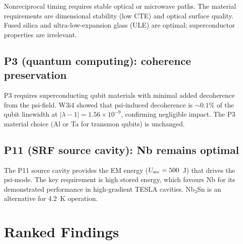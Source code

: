 \documentclass[11pt]{article}
\theoremstyle{definition}
\theoremstyle{remark}
\newcommand{\ee}[1]{\times 10^{#1}}
\newcommand{\lambdabound}{1.56\ee{-9}}
\newcommand{\lam}{|\lambda-1|}
\begin{document}
Nonreciprocal timing requires stable optical or microwave paths. The
material requirements are dimensional stability (low CTE) and optical
surface quality. Fused silica and ultra-low-expansion glass (ULE) are
optimal; superconductor properties are irrelevant.

\subsection{P3 (quantum computing): coherence preservation}

P3 requires superconducting qubit materials with minimal added
decoherence from the psi-field. W3i4 showed that psi-induced decoherence
is $\sim 0.1\%$ of the qubit linewidth at $\lam = \lambdabound$,
confirming negligible impact. The P3 material choice (Al or Ta for
transmon qubits) is unchanged.

\subsection{P11 (SRF source cavity): Nb remains optimal}

The P11 source cavity provides the EM energy ($U_{\rm src} = 500$~J)
that drives the psi-mode. The key requirement is high stored energy,
which favours Nb for its demonstrated performance in high-gradient
TESLA cavities. Nb$_3$Sn is an alternative for 4.2~K operation.


\section{Ranked Findings}
\label{sec:ranked}
\end{document}
